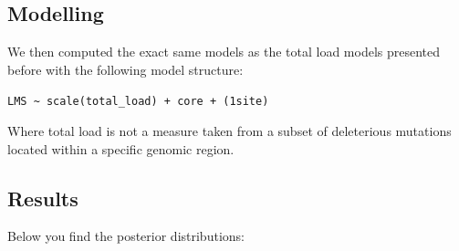 \documentclass[
  letterpaper,
  DIV=11,
  numbers=noendperiod]{scrreprt}
\begin{document}
\subsection{Modelling}\label{modelling}

We then computed the exact same models as the total load models
presented before with the following model structure:

\texttt{LMS\ \textasciitilde{}\ scale(total\_load)\ +\ core\ +\ (1\textbar{}site)}

Where total load is not a measure taken from a subset of deleterious
mutations located within a specific genomic region.

\subsection{Results}\label{results-3}

Below you find the posterior distributions:
\end{document}
